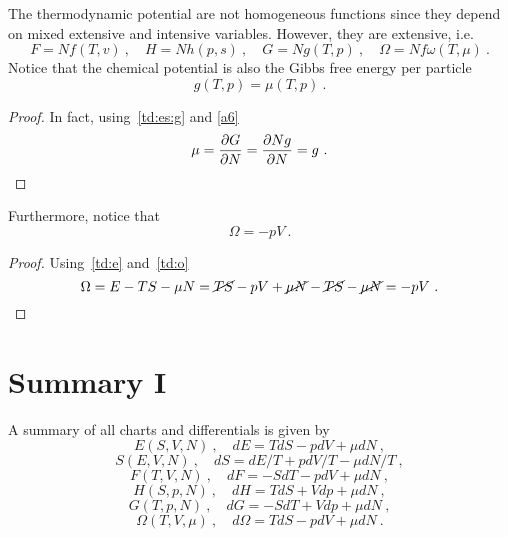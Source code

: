     The thermodynamic potential are not homogeneous functions since they depend on mixed extensive and intensive variables. However, they are extensive, i.e. 
    \begin{equation}\label{a6}
        F = N f(T, v) ~, \quad H = N h(p, s) ~, \quad G = N g(T, p) ~, \quad \Omega = N f \omega (T, \mu) ~. 
    \end{equation}
    Notice that the chemical potential is also the Gibbs free energy per particle
    \begin{equation}
        g(T, p) = \mu(T, p) ~.
    \end{equation}
    \begin{proof}
        In fact, using~\eqref{td:es:g} and \eqref{a6}
        \begin{equation*}
            \mu = \frac{\partial G}{\partial N} = \frac{\partial Ng }{\partial N} = g ~.
        \end{equation*}
    \end{proof}

    Furthermore, notice that 
    \begin{equation*}
        \Omega = - pV ~.
    \end{equation*}
    \begin{proof}
        Using~\eqref{td:e} and~\eqref{td:o}
        \begin{equation*}
            \Omega = E - TS - \mu N = \cancel{TS} - pV + \cancel{\mu N} - \cancel{TS} - \cancel{\mu N} = - pV ~.
        \end{equation*}
    \end{proof}

\section{Summary I}

    A summary of all charts and differentials is given by 
    \begin{equation*}
        E(S, V, N) ~, \quad dE = TdS - p dV + \mu dN ~,
    \end{equation*}
    \begin{equation*}
        S(E, V, N) ~, \quad dS = dE/T + p dV/T - \mu dN/T ~,
    \end{equation*}
    \begin{equation*}
        F(T, V, N) ~, \quad dF = - S dT - p dV + \mu dN ~,
    \end{equation*}
    \begin{equation*}
        H(S, p, N) ~, \quad dH = TdS + V dp + \mu dN ~,
    \end{equation*}
    \begin{equation*}
        G(T, p, N) ~, \quad d G = - SdT + V dp + \mu dN ~,
    \end{equation*}
    \begin{equation*}
        \Omega(T, V, \mu) ~, \quad d\Omega = TdS - p dV + \mu dN ~.
    \end{equation*}

